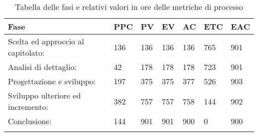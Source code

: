 

\begin{longtable}{f m m m m m m}  
			 Fase & PPC & PV & EV & AC & ETC & EAC \\
\endhead

Scelta ed approccio al capitolato: 	& 136 & 136 & 136 & 136 & 765 & 901 \\
\hline
Analisi di dettaglio: 				& 42  & 178 & 178 & 178 & 723 & 901 \\
\hline
Progettazione e sviluppo: 			& 197 & 375 & 375 & 377 & 526 & 903 \\
\hline
Sviluppo ulteriore ed incremento: 	& 382 & 757 & 757 & 758 & 144 & 902\\
\hline
Conclusione: 						& 144 & 901 & 901 & 900 & 0   & 900\\
\hline

\bottomrule
\caption{Tabella delle fasi e relativi valori in ore delle metriche di processo}
\end{longtable}
